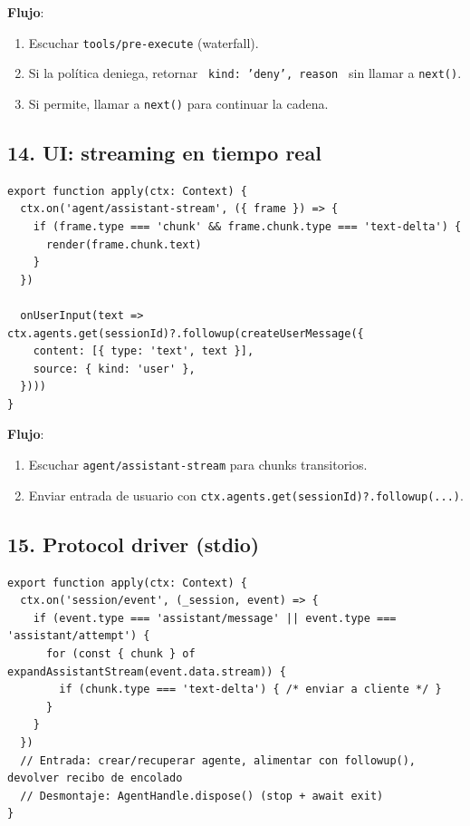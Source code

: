 \documentclass[11pt,a4paper]{article}
\begin{document}
\textbf{Flujo}:


\begin{enumerate}[leftmargin=*,topsep=2pt,itemsep=1pt]
  \item Escuchar \texttt{tools/pre-execute} (waterfall).
  \item Si la política deniega, retornar \texttt{{ kind: 'deny', reason }} sin llamar a \texttt{next()}.
  \item Si permite, llamar a \texttt{next()} para continuar la cadena.
\end{enumerate}


\subsection*{14. UI: streaming en tiempo real}


\begin{lstlisting}
export function apply(ctx: Context) {
  ctx.on('agent/assistant-stream', ({ frame }) => {
    if (frame.type === 'chunk' && frame.chunk.type === 'text-delta') {
      render(frame.chunk.text)
    }
  })

  onUserInput(text => ctx.agents.get(sessionId)?.followup(createUserMessage({
    content: [{ type: 'text', text }],
    source: { kind: 'user' },
  })))
}
\end{lstlisting}


\textbf{Flujo}:


\begin{enumerate}[leftmargin=*,topsep=2pt,itemsep=1pt]
  \item Escuchar \texttt{agent/assistant-stream} para chunks transitorios.
  \item Enviar entrada de usuario con \texttt{ctx.agents.get(sessionId)?.followup(...)}.
\end{enumerate}


\subsection*{15. Protocol driver (stdio)}


\begin{lstlisting}
export function apply(ctx: Context) {
  ctx.on('session/event', (_session, event) => {
    if (event.type === 'assistant/message' || event.type === 'assistant/attempt') {
      for (const { chunk } of expandAssistantStream(event.data.stream)) {
        if (chunk.type === 'text-delta') { /* enviar a cliente */ }
      }
    }
  })
  // Entrada: crear/recuperar agente, alimentar con followup(), devolver recibo de encolado
  // Desmontaje: AgentHandle.dispose() (stop + await exit)
}
\end{lstlisting}
\end{document}
